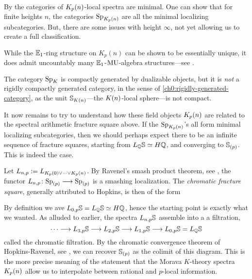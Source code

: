 \begin{remark}
    By \cite[7.5]{hovey-strickland_99} the categories of $\Kpn$-local spectra are minimal. One can show that for finite heights $n$, the categories $\Sp_\Kpn$ are all the minimal localizing subcategories. But, there are some issues with height $\infty$, not yet allowing us to create a full classification. 
\end{remark}

\begin{remark}
    While the $\E_1$-ring structure on $K_p(n)$ can be shown to be essentially unique, it does admit uncountably many $\E_1$-$\MU$-algebra structures---see \cite{angeltveit_2011}. 
\end{remark}

\begin{remark}
    \label{ch0:rm:SpKn-not-rigidly-generated}
    The category $\SpK$ is compactly generated by dualizable objects, but it is \emph{not} a rigidly compactly generated category, in the sense of \cref{ch0:rigidly-generated-category}, as the unit $\S_\Kn$---the $\Kn$-local sphere---is not compact.  
\end{remark}

It now remains to try to understand how these field objects $\Kpn$ are related to the spectral arithmetic fracture square above. If the $\Sp_\Kpn$'s all form minimal localizing subcategories, then we should perhaps expect there to be an infinite sequence of fracture squares, starting from $L_\Q \S \simeq H\Q$, and converging to $\S_{(p)}$. This is indeed the case. 

\begin{construction}
    Let $L\np := L_{K_p(0)\vee \cdots \vee K_p(n)}$. By Ravenel's smash product theorem, see \cite[7.5.6]{ravenel_92}, the functor $L\np\colon \Sp_{(p)}\longrightarrow \Sp_{(p)}$ is a smashing localization. The \emph{chromatic fracture square}, generally attributed to Hopkins, is then of the form 
    \begin{center}
    \end{center}
    By definition we ave $L_{0,p} \S = L_\Q \S \simeq H\Q$, hence the starting point is exactly what we wanted. As alluded to earlier, the spectra $L\np\S$ assemble into a a filtration, 
    \[\cdots \longrightarrow L_{3,p}\S \longrightarrow L_{2,p}\S \longrightarrow L_{1,p}\S \longrightarrow L_{0,p} \S = L_\Q\S\]
    called the chromatic filtration. By the chromatic convergence theorem of Hopkins-Ravenel, see \cite[7.5.7]{ravenel_92}, we can recover $\S_{(p)}$ as the colimit of this diagram. This is the more precise meaning of the statement that the Morava $K$-theory spectra $\Kpn$ allow us to interpolate between rational and $p$-local information. 
\end{construction}

